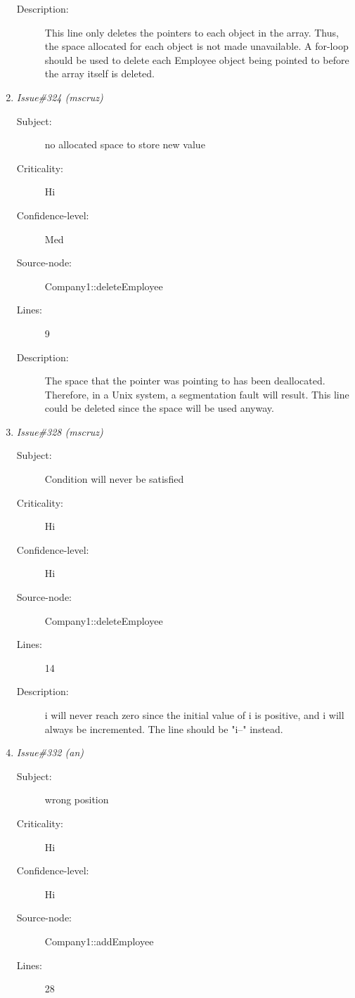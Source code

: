 \begin{enumerate}
\begin{description}
\item [Description:] This line only deletes the pointers to each
object in the array.  Thus, the space allocated for each object is not made
unavailable.  A for-loop should be used to delete each Employee object being
pointed to before the array itself is deleted.
\end{description}
\item {\it Issue\#324 (mscruz)}
\begin{description}
\item [Subject:] no allocated space to store new value
\item [Criticality:] Hi
\item [Confidence-level:] Med
\item [Source-node:] Company1::deleteEmployee

\item [Lines:] 9

\item [Description:] The space that the pointer was pointing to has
been deallocated.  Therefore, in a Unix system, a segmentation fault will
result.  This line could be deleted since the space will be used anyway.
\end{description}
\item {\it Issue\#328 (mscruz)}
\begin{description}
\item [Subject:] Condition will never be satisfied
\item [Criticality:] Hi
\item [Confidence-level:] Hi
\item [Source-node:] Company1::deleteEmployee

\item [Lines:] 14

\item [Description:] i will never reach zero since the initial
value of i is positive, and i will always be incremented.  The line should be
"i--" instead.
\end{description}
\item {\it Issue\#332 (an)}
\begin{description}
\item [Subject:] wrong position
\item [Criticality:] Hi
\item [Confidence-level:] Hi
\item [Source-node:] Company1::addEmployee

\item [Lines:] 28


\end{description}
\end{enumerate}
